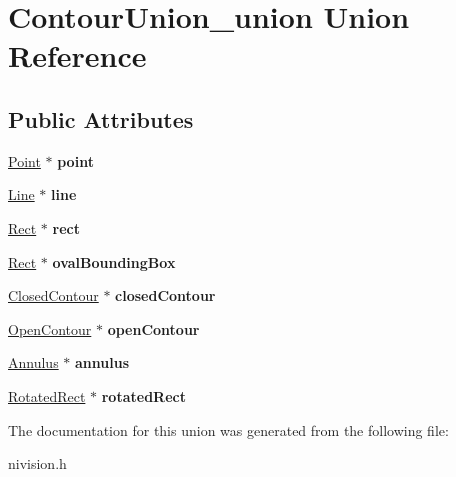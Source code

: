 \hypertarget{unionContourUnion__union}{\section{\-Contour\-Union\-\_\-union \-Union \-Reference}
\label{unionContourUnion__union}
}
\subsection*{\-Public \-Attributes}
\begin{DoxyCompactItemize}
\item 
\hypertarget{unionContourUnion__union_ae6caaf952005075a2e2b62efb7d830f0}{\hyperlink{structPoint__struct}{\-Point} $\ast$ {\bfseries point}}\label{unionContourUnion__union_ae6caaf952005075a2e2b62efb7d830f0}

\item 
\hypertarget{unionContourUnion__union_a7bbcb07a555bcb91ee1e35632590520a}{\hyperlink{structLine__struct}{\-Line} $\ast$ {\bfseries line}}\label{unionContourUnion__union_a7bbcb07a555bcb91ee1e35632590520a}

\item 
\hypertarget{unionContourUnion__union_a3a16e0e2281a6c1b145bb57ab2e69b6e}{\hyperlink{structRect__struct}{\-Rect} $\ast$ {\bfseries rect}}\label{unionContourUnion__union_a3a16e0e2281a6c1b145bb57ab2e69b6e}

\item 
\hypertarget{unionContourUnion__union_a5f11bb31b642ac368503ca40f5022a1a}{\hyperlink{structRect__struct}{\-Rect} $\ast$ {\bfseries oval\-Bounding\-Box}}\label{unionContourUnion__union_a5f11bb31b642ac368503ca40f5022a1a}

\item 
\hypertarget{unionContourUnion__union_a85ee19e39ea6f7996591d51415a0db6a}{\hyperlink{structClosedContour__struct}{\-Closed\-Contour} $\ast$ {\bfseries closed\-Contour}}\label{unionContourUnion__union_a85ee19e39ea6f7996591d51415a0db6a}

\item 
\hypertarget{unionContourUnion__union_adab99e6f29795a80af3ff41a2da1be55}{\hyperlink{structOpenContour__struct}{\-Open\-Contour} $\ast$ {\bfseries open\-Contour}}\label{unionContourUnion__union_adab99e6f29795a80af3ff41a2da1be55}

\item 
\hypertarget{unionContourUnion__union_a87286bde824ee75d5134464084042d8e}{\hyperlink{structAnnulus__struct}{\-Annulus} $\ast$ {\bfseries annulus}}\label{unionContourUnion__union_a87286bde824ee75d5134464084042d8e}

\item 
\hypertarget{unionContourUnion__union_ab3b4c430a02019466e8e173f1e904bed}{\hyperlink{structRotatedRect__struct}{\-Rotated\-Rect} $\ast$ {\bfseries rotated\-Rect}}\label{unionContourUnion__union_ab3b4c430a02019466e8e173f1e904bed}

\end{DoxyCompactItemize}


\-The documentation for this union was generated from the following file\-:\begin{DoxyCompactItemize}
\item 
nivision.\-h\end{DoxyCompactItemize}
